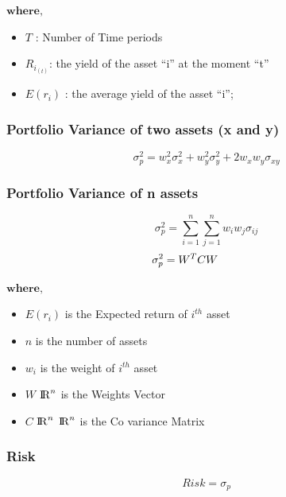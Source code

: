 \documentclass[conference]{IEEEtran}
\begin{document}
        $ \textbf{where,} $
        \begin{itemize}
            \item $ T $ : Number of Time periods
            \item $ R_{i_{(t)}} $: the yield of the asset “i” at the moment “t”
            \item $ E(r_i) $ : the average yield of the asset “i”; 

        \end{itemize}
    
    \text{\n}
    
    \subsubsection{Portfolio Variance of two assets (x and y)}
        \[
            \sigma_p^2 = 
            w_x^2\sigma_x^2 + 
            w_y^2\sigma_y^2 + 
            2 w_x w_y \sigma_{xy}
        \]
        
    \subsubsection{Portfolio Variance of n assets}
        \[
            \sigma_p^2 = 
            \sum_{i=1}^{n}
            \sum_{j=1}^{n}
            w_i w_j \sigma_{ij}
        \]
        \text{\n}
        \[
            \sigma_p^2 = 
            W^T C W
            \hspace{1.35cm}
        \]
        
        $ \textbf{where,} $
        \begin{itemize}
            \item $E(r_i)$ is the Expected return of $i^{th}$ asset
            \item $n$ is the number of assets
            \item $w_i$ is the weight of $i^{th}$ asset
            \item $W$ \in \hspace{0.1cm} ${\rm I\!R}^n$ is the Weights Vector
            \item $C$ \in \hspace{0.1cm} ${\rm I\!R}^n$\times \hspace{0.1cm} ${\rm I\!R}^n$ is the Co variance Matrix
        \end{itemize}
    
    \text{\n}
    \subsubsection {Risk}
        \[
            Risk = \sigma_p 
        \]
    
\end{document}
